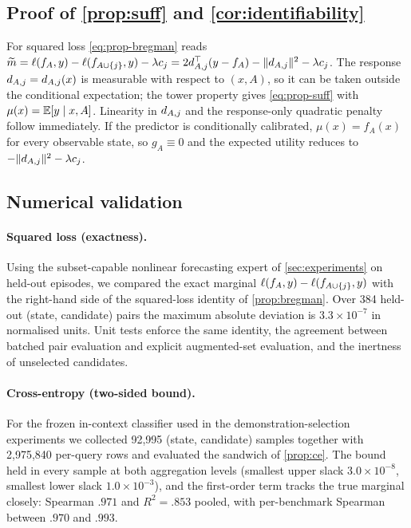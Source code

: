 \subsection{Proof of \cref{prop:suff} and \cref{cor:identifiability}}
For squared loss \eqref{eq:prop-bregman} reads
$\widetilde{m}=\ell(f_A,y)-\ell(f_{A\cup\{j\}},y)-\lambda c_j
=2d_{A,j}^\top(y-f_A)-\|d_{A,j}\|^2-\lambda c_j$. The response $d_{A,j}=d_{A,j}(x)$ is
measurable with respect to $(x,A)$, so it can be taken outside the conditional
expectation; the tower property gives \eqref{eq:prop-suff} with
$\mu(x)=\mathbb{E}[y\mid x,A]$. Linearity in $d_{A,j}$ and the response-only quadratic
penalty follow immediately. If the predictor is conditionally calibrated,
$\mu(x)=f_A(x)$ for every observable state, so $g_A\equiv0$ and the expected
utility reduces to $-\|d_{A,j}\|^2-\lambda c_j$.

\subsection{Numerical validation}
\label{app:validation}

\paragraph{Squared loss (exactness).} Using the subset-capable nonlinear
forecasting expert of \cref{sec:experiments} on held-out episodes, we compared
the exact marginal $\ell(f_A,y)-\ell(f_{A\cup\{j\}},y)$ with the right-hand
side of the squared-loss identity of \cref{prop:bregman}. Over 384 held-out
(state, candidate) pairs the maximum absolute deviation is $3.3\times10^{-7}$ in
normalised units. Unit tests enforce the same identity, the agreement between
batched pair evaluation and explicit augmented-set evaluation, and the
inertness of unselected candidates.

\paragraph{Cross-entropy (two-sided bound).} For the frozen in-context
classifier used in the demonstration-selection experiments we collected 92{,}995 (state, candidate) samples together
with 2{,}975{,}840 per-query rows and evaluated the sandwich of
\cref{prop:ce}. The bound held in every sample at both aggregation levels
(smallest upper slack $3.0\times10^{-8}$, smallest lower slack
$1.0\times10^{-3}$), and the first-order term tracks the true marginal closely:
Spearman $.971$ and $R^2=.853$ pooled, with per-benchmark Spearman between
$.970$ and $.993$.

